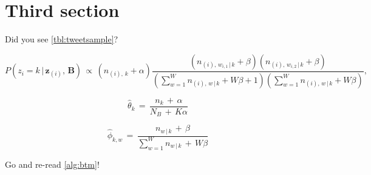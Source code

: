 \clearpage

\restoregeometry

\section{Third section}

\lipsum[12-13]

Did you see \autoref{tbl:tweetsample}?

\begin{equation}
P(z_{i}=k\,|\,\mathbf{z}_{(i)},\,\textbf{B}) \,\propto\, (n_{(i),\,k} + \alpha)
\frac{(n_{(i),\,w_{i,1}\,|\,k} + \beta)(n_{(i),\,w_{i,2}\,|\,k} + \beta)}
{(\sum_{w=1}^{W}n_{(i),\,w\,|\,k} + W\beta + 1)(\sum_{w=1}^{W}n_{(i),\,w\,|\,k} + W\beta)},
\label{eqn:btm_conditional}
\end{equation}

\begin{equation}
\widehat{\theta}_{k} \,=\, \frac{n_{k} \,+\, \alpha}{N_{B} \,+\, K\alpha}
\label{eqn:btm_theta}
\end{equation}

\begin{equation}
\widehat{\phi}_{k,w} \,=\, \frac{n_{w\,|\,k} \,+\, \beta}{\sum_{w=1}^{W}n_{w\,|\,k} \,+\, W\beta}
\label{eqn:btm_phi}
\end{equation}

\lipsum[14] Go and re-read \autoref{alg:btm}!